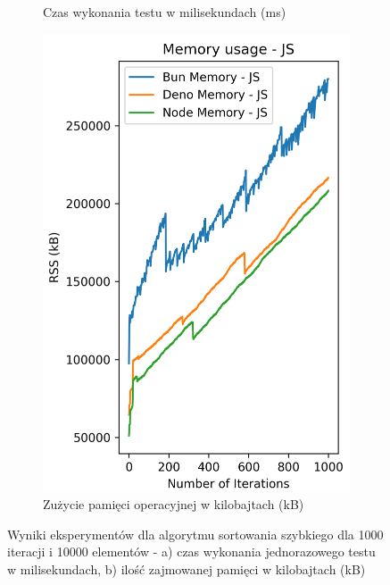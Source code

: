 \begin{figure}[H]
\begin{subfigure}[b]{0.42\textwidth}
    \caption{Czas wykonania testu w milisekundach (ms)}
    \label{fig:quick_sorting_e4_time}
  \end{subfigure}
  \begin{subfigure}[b]{0.42\textwidth}
    \centering
    \includegraphics[width=\textwidth]{Figures/sorting/sorting_quick_1000_10000_js_memory.png}
    \caption{Zużycie pamięci operacyjnej w kilobajtach (kB)}
    \label{fig:quick_sorting_e4_memory}
  \end{subfigure}
  \caption{Wyniki eksperymentów dla algorytmu sortowania szybkiego dla 1000 iteracji i 10000 elementów - a) czas wykonania jednorazowego testu w milisekundach, b) ilość zajmowanej pamięci w kilobajtach (kB)}
  \label{fig:quick_sorting_e4}
\end{figure}

